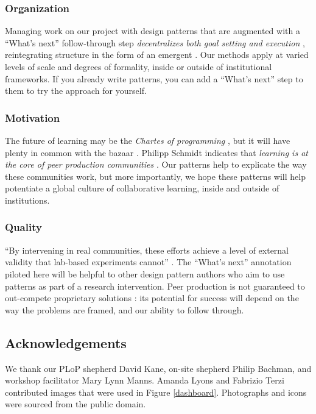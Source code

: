 \vspace{-.25\baselineskip}

\subsubsection*{Organization} 
Managing work on our project with design patterns that are augmented
with a ``What's next'' follow-through step \emph{decentralizes both
  goal setting and execution} \cite{benkler2015peer}, reintegrating
structure in the form of an emergent .  Our
methods apply at varied levels of scale and degrees of formality,
inside or outside of institutional frameworks.  If you already write
patterns, you can add a ``What's next'' step to them to try the
approach for yourself.

\vspace{-.25\baselineskip}

\subsubsection*{Motivation}  The future of learning may be
the \emph{Chartes of programming} \cite{alexander1999origins}, but it will have plenty in common with the
bazaar \cite{raymond2001cathedral}.
%
Philipp Schmidt indicates that \emph{learning is at the core of peer
  production communities} \cite{schmidt+commons-based+2009}.  Our
patterns help to explicate the way these communities work, but more
importantly, we hope these patterns will help potentiate a global
culture of collaborative learning, inside and outside of institutions.

\vspace{-.25\baselineskip}

\subsubsection*{Quality} 
``By intervening in real communities, these efforts achieve a level of
external validity that lab-based experiments cannot''
\cite{benkler2015peer}.  The ``What's next'' annotation piloted here
will be helpful to other design pattern authors who aim to use
patterns as part of a research intervention.  Peer production is not guaranteed to
  out-compete proprietary solutions
\cite{benkler2015peer,free-software-better}: its potential for
success will depend on the way the problems are framed,
and our ability to follow through.

\subsection*{Acknowledgements}
We thank our PLoP shepherd David Kane, on-site shepherd Philip
Bachman, and workshop facilitator Mary Lynn Manns.  Amanda Lyons and
Fabrizio Terzi contributed images that were used in Figure
\ref{dashboard}.  Photographs and icons were sourced from the public
domain.


